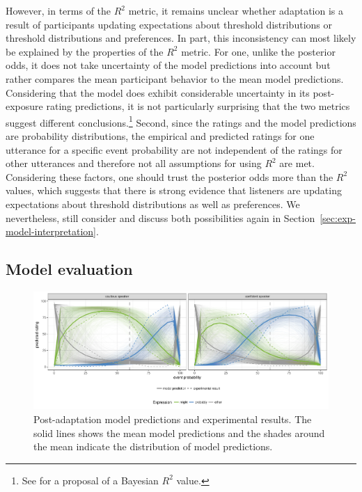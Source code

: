 \documentclass[lucida,biblatex]{sp} %
\newcommand{\sectionref}[1]{Section~\ref{#1}}
\begin{document}
However, in terms of the $R^2$ metric, it remains unclear whether adaptation is a result of 
participants updating expectations about threshold distributions or threshold distributions and preferences. 
In part, this inconsistency can most likely be explained by the properties of the $R^2$ metric. For one, unlike the posterior odds, 
it does not take uncertainty of the model predictions into account but rather compares the mean participant behavior to the mean 
model predictions. Considering that the model does exhibit considerable uncertainty in its post-exposure rating predictions, it is not
particularly surprising that the two metrics suggest different conclusions.\footnote{See \citep{Gelman2018} for a proposal of a Bayesian $R^2$ value.}
Second, since the ratings and the model predictions are probability distributions, 
the empirical and predicted ratings for one utterance for a specific event probability are not independent 
of the ratings for other utterances and therefore not all assumptions for using $R^2$ are met. Considering these
factors, one should trust the posterior odds more than the $R^2$ values, which suggests that there is strong evidence that listeners 
are updating expectations about {threshold distributions} as well as {preferences}. We nevertheless, still consider and discuss both possibilities
again in \sectionref{sec:exp-model-interpretation}.



\subsection{Model evaluation}

\begin{figure}
  \includegraphics[width=\textwidth]{plots/adaptation-posterior-predictions.pdf}
  \caption{Post-adaptation model predictions and experimental results. 
  The solid lines shows the mean model predictions and the shades around the mean indicate the distribution of model predictions. \label{fig:post-exposure-model}}
\end{figure}
\end{document}
